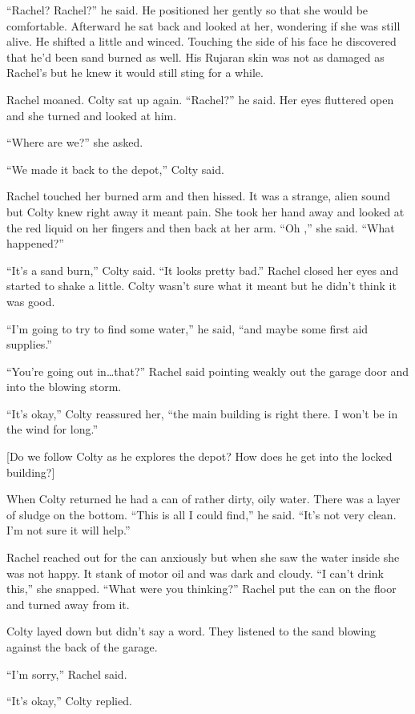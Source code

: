 ``Rachel? Rachel?'' he said. He positioned her gently so that she would be comfortable.
Afterward he sat back and looked at her, wondering if she was still alive. He shifted a little
and winced. Touching the side of his face he discovered that he'd been sand burned as well. His
Rujaran skin was not as damaged as Rachel's but he knew it would still sting for a while.

Rachel moaned. Colty sat up again. ``Rachel?'' he said. Her eyes fluttered open and she turned
and looked at him.

``Where are we?'' she asked.

``We made it back to the depot,'' Colty said.

Rachel touched her burned arm and then hissed. It was a strange, alien sound but Colty knew
right away it meant pain. She took her hand away and looked at the red liquid on her fingers and
then back at her arm. ``Oh ,'' she said. ``What happened?''

``It's a sand burn,'' Colty said. ``It looks pretty bad.'' Rachel closed her eyes and started to
shake a little. Colty wasn't sure what it meant but he didn't think it was good.

``I'm going to try to find some water,'' he said, ``and maybe some first aid supplies.''

``You're going out in\ldots that?'' Rachel said pointing weakly out the garage door and into the
blowing storm.

``It's okay,'' Colty reassured her, ``the main building is right there. I won't be in the wind
for long.''

[Do we follow Colty as he explores the depot? How does he get into the locked building?]

When Colty returned he had a can of rather dirty, oily water. There was a layer of sludge on the
bottom. ``This is all I could find,'' he said. ``It's not very clean. I'm not sure it will
help.''

Rachel reached out for the can anxiously but when she saw the water inside she was not happy. It
stank of motor oil and was dark and cloudy. ``I can't drink this,'' she snapped. ``What were you
thinking?'' Rachel put the can on the floor and turned away from it.

Colty layed down but didn't say a word. They listened to the sand blowing against the back of
the garage.

``I'm sorry,'' Rachel said.

``It's okay,'' Colty replied.


